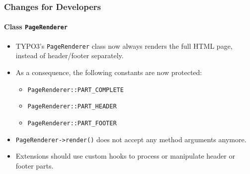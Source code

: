 %

\begin{frame}[fragile]
	\frametitle{Changes for Developers}
	\framesubtitle{Class \texttt{PageRenderer}}

	\begin{itemize}
		\item TYPO3's \small\texttt{PageRenderer}\normalsize
			class now always renders the full HTML page, instead of
			header/footer separately.

		\item As a consequence, the following constants are now protected:

			\begin{itemize}\small
				\item \texttt{PageRenderer::PART\_COMPLETE}
				\item \texttt{PageRenderer::PART\_HEADER}
				\item \texttt{PageRenderer::PART\_FOOTER}
			\end{itemize}

		\item \texttt{PageRenderer->render()} does not accept any method
			arguments anymore.

		\item Extensions should use custom hooks to process or manipulate header
			or footer parts.

	\end{itemize}
\end{frame}

